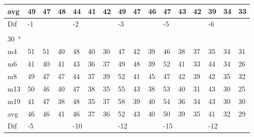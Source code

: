 \begin{table}[H]
\begin{tabular}{l|l|l|l|l|l|l|l|l|l|l|l|l|lll}
avg & 49     &  47    &  48    &  44    &  41    &   42   &  49    &  47     & 46     &  47     &  43    &   42   & \multicolumn{1}{l|}{39} & \multicolumn{1}{l|}{34}  &33  \\ \hline  
Dif & \multicolumn{3}{l|}{-1} & \multicolumn{3}{l|}{-2} & \multicolumn{3}{l|}{-3} & \multicolumn{3}{l|}{-5} & \multicolumn{3}{l}{-6}  \\ 
 \multicolumn{16}{l}{ } \\                             
\SI{30}{\degree}   & \multicolumn{3}{l|}{} & \multicolumn{3}{l|}{} & \multicolumn{3}{l|}{} & \multicolumn{3}{l|}{} & \multicolumn{3}{l}{}   \\  \hline
m4    &  51    &  51    & 40     & 48     &  40    &   30   &   47   &   42    &  39    &   46    &   38   &   37   & \multicolumn{1}{l|}{35} & \multicolumn{1}{l|}{34} & 31 \\
m6    &  41    &   40   &  41    & 43     &   36   &  37    &    49  &   48    &  39    &   52    &   41   &   33   & \multicolumn{1}{l|}{44} & \multicolumn{1}{l|}{34} & 26 \\
m8    &  49    &  47    & 47     &  44    &  37    &   39   &   52   &   41    &  45    &   47    &    42  &   39   & \multicolumn{1}{l|}{42} & \multicolumn{1}{l|}{35} & 32 \\
m13  &   50   & 46     &   40   & 47     &   38   &   35   &   55   &   43    &  38    &   53    &   40   &   31   & \multicolumn{1}{l|}{43} & \multicolumn{1}{l|}{30} & 25 \\
m19  &  41    &  47    &  38    &  48    &  35    &   37   &   58   &    39   &  40    &   54    &   36   &    34  & \multicolumn{1}{l|}{43} & \multicolumn{1}{l|}{30} & 30 \\ \hline
avg &  46    &   46   &  41    &  46    &  37    & 36     &  52    &   43    & 40     &   50    & 39     &   35   & \multicolumn{1}{l|}{41} & \multicolumn{1}{l|}{32}  &29  \\ \hline  
Dif & \multicolumn{3}{l|}{-5} & \multicolumn{3}{l|}{-10} & \multicolumn{3}{l|}{-12} & \multicolumn{3}{l|}{-15} & \multicolumn{3}{l}{-12}                                
\end{tabular}
\end{table}


